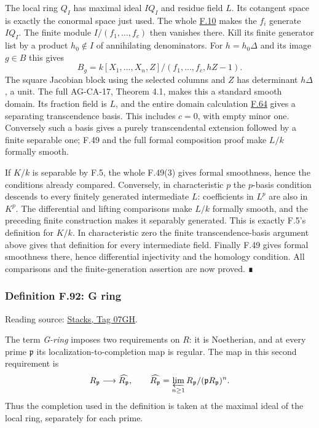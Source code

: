 \documentclass[11pt,a4paper,openany]{report}
\begin{document}
The local ring \(Q_I\) has maximal ideal \(IQ_I\) and residue field \(L\). Its cotangent space is exactly the conormal space just used. The whole \hyperref[AG-RG-S05-algebra-lemma-NAK]{F.10} makes the \(f_i\) generate \(IQ_I\). The finite module \(I/(f_1,\ldots,f_c)\) then vanishes there. Kill its finite generator list by a product \(h_0\notin I\) of annihilating denominators. For \(h=h_0\Delta\) and its image \(g\in B\) this gives \[B_g=k[X_1,\ldots,X_n,Z]/(f_1,\ldots,f_c,hZ-1).\] The square Jacobian block using the selected columns and \(Z\) has determinant \(h\Delta\), a unit. The full AG-CA-17, Theorem 4.1, makes this a standard smooth domain. Its fraction field is \(L\), and the entire domain calculation \hyperref[AG-RG-S05-algebra-lemma-localization-smooth-separable]{F.64} gives a separating transcendence basis. This includes \(c=0\), with empty minor one. Conversely such a basis gives a purely transcendental extension followed by a finite separable one; F.49 and the full formal composition proof make \(L/k\) formally smooth.

If \(K/k\) is separable by F.5, the whole F.49(3) gives formal smoothness, hence the conditions already compared. Conversely, in characteristic \(p\) the \(p\)-basis condition descends to every finitely generated intermediate \(L\): coefficients in \(L^p\) are also in \(K^p\). The differential and lifting comparisons make \(L/k\) formally smooth, and the preceding finite construction makes it separably generated. This is exactly F.5's definition for \(K/k\). In characteristic zero the finite transcendence-basis argument above gives that definition for every intermediate field. Finally F.49 gives formal smoothness there, hence differential injectivity and the homology condition. All comparisons and the finite-generation assertion are now proved. ∎

\label{AG-RG-S05-more-algebra-definition-G-ring}

\subsubsection{Definition F.92: G ring}\label{AG-RG-S05-definition-f.92-g-ring}

Reading source: \href{https://stacks.math.columbia.edu/tag/07GH}{Stacks, Tag 07GH}.

The term \emph{G-ring} imposes two requirements on \(R\): it is Noetherian, and at every prime \(\mathfrak p\) its localization-to-completion map is regular. The map in this second requirement is \[
R_{\mathfrak p}\longrightarrow\widehat{R_{\mathfrak p}},
\qquad
\widehat{R_{\mathfrak p}}
=\varprojlim_{n\ge1}R_{\mathfrak p}/(\mathfrak pR_{\mathfrak p})^n.
\] Thus the completion used in the definition is taken at the maximal ideal of the local ring, separately for each prime.
\end{document}
